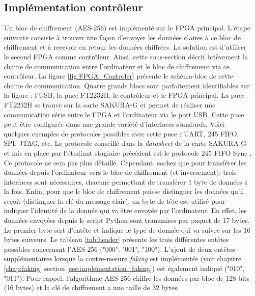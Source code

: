 \documentclass[oneside]{book}
\begin{document}
\subsection{Implémentation contrôleur}
\label{sec:Imp_contrôleur}

Un bloc de chiffrement (AES-256) est implémenté sur le FPGA principal. L'étape suivante consiste à trouver une façon d'envoyer les données claires à ce bloc de chiffrement et à recevoir en retour les données chiffrées. La solution est d'utiliser le second FPGA comme contrôleur. Ainsi, cette sous-section décrit brièvement la chaine de communication entre l'ordinateur et le bloc de chiffrement via ce contrôleur. La figure \ref{fig:FPGA_Controler} présente le schéma-bloc de cette chaine de communication. Quatre grands blocs sont parfaitement identifiables sur la figure : l'USB, la puce FT2232H, le contrôleur et le FPGA principal. La puce FT2232H se trouve sur la carte SAKURA-G et permet de réaliser une communication série entre le FPGA et l'ordinateur via le port USB. Cette puce peut être configurée dans une grande variété d'interfaces standards. Voici quelques exemples de protocoles possibles avec cette puce : UART, 245 FIFO, SPI, JTAG, etc. Le protocole conseillé dans la \textit{datasheet} de la carte SAKURA-G et mis en place par l'étudiant stagiaire précédent est le protocole 245 FIFO Sync \cite{noauthor_an_165_2012}. Ce protocole ne sera pas plus détaillé. Cependant, sachez que pour transférer les données depuis l'ordinateur vers le bloc de chiffrement (et inversement), trois interfaces sont nécessaires, chacune permettant de transférer 1 byte de données à la fois. Enfin, pour que le bloc de chiffrement puisse distinguer les données qu'il reçoit (distinguer la clé du message clair), un byte de tête est utilisé pour indiquer l'identité de la donnée qui va être envoyée par l'ordinateur. En effet, les données envoyées depuis le script Python sont transmises par paquet de 17 bytes. Le premier byte sert d'entête et indique le type de donnée qui va suivre sur les 16 bytes suiveurs. Le tableau \ref{tab:header} présente les trois différentes entêtes possibles concernant l'AES-256 ("000", "001", "100"). L'ajout de deux entêtes supplémentaires lorsque la contre-mesure \textit{faking} est implémentée (voir chapitre \ref{chap:faking} section \ref{sec:implementation_faking}) est également indiqué ("010", "011"). Pour rappel, l'algorithme AES-256 chiffre les données par bloc de 128 bits (16 bytes) et la clé de chiffrement a une taille de 32 bytes.
\vspace{0.4cm}
\end{document}
